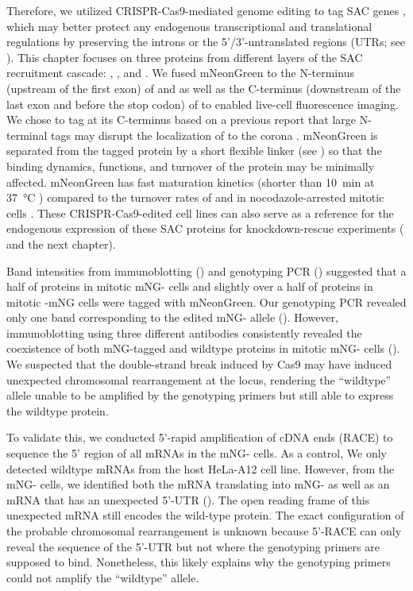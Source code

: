 Therefore, we utilized CRISPR-Cas9-mediated genome editing to tag SAC genes  \cite{HDRTiming, Atlas}, which may better protect any endogenous transcriptional and translational regulations by preserving the introns or the 5'/3'-untranslated regions (UTRs; see ). This chapter focuses on three proteins from different layers of the SAC recruitment cascade: , , and . We fused mNeonGreen to the N-terminus (upstream of the first exon) of  and  as well as the C-terminus (downstream of the last exon and before the stop codon) of  to enabled live-cell fluorescence imaging. We chose to tag  at its C-terminus based on a previous report that large N-terminal tags may disrupt the localization of  to the corona \cite{CoronaActivatesSAC}. mNeonGreen is separated from the tagged protein by a short flexible linker (see ) so that the binding dynamics, functions, and turnover of the protein may be minimally affected. mNeonGreen has fast maturation kinetics (shorter than \SI{10}{min} at \SI{37}{\celsius} \cite{mNG}) compared to the turnover rates of  and  in nocodazole-arrested mitotic cells \cite{BubR1MitosisTurnover, Bub1MitosisTurnover}. These CRISPR-Cas9-edited cell lines can also serve as a reference for the endogenous expression of these SAC proteins for knockdown-rescue experiments ( and the next chapter).

Band intensities from immunoblotting () and genotyping PCR () suggested that a half of  proteins in mitotic mNG- cells and slightly over a half of  proteins in mitotic -mNG cells were tagged with mNeonGreen. Our genotyping PCR revealed only one band corresponding to the edited mNG- allele (). However, immunoblotting using three different antibodies consistently revealed the coexistence of both mNG-tagged and wildtype  proteins in mitotic mNG- cells (). We suspected that the double-strand break induced by Cas9 may have induced unexpected chromosomal rearrangement at the  locus, rendering the ``wildtype'' allele unable to be amplified by the genotyping primers but still able to express the wildtype  protein.

To validate this, we conducted 5'-rapid amplification of cDNA ends (RACE) to sequence the 5' region of all  mRNAs in the mNG- cells. As a control, We only detected wildtype  mRNAs from the host HeLa-A12 cell line. However, from the mNG- cells, we identified both the mRNA translating into mNG- as well as an mRNA that has an unexpected 5'-UTR (). The open reading frame of this unexpected mRNA still encodes the wild-type  protein. The exact configuration of the probable chromosomal rearrangement is unknown because 5'-RACE can only reveal the sequence of the 5'-UTR but not where the genotyping primers are supposed to bind. Nonetheless, this likely explains why the genotyping primers could not amplify the ``wildtype'' allele.

